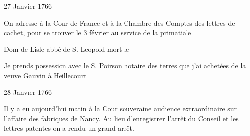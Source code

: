                     \begin{diary}{27 Janvier 1766}{}
                        
                         On adresse à la Cour de France et à la Chambre des
                              Comptes des lettres de cachet, pour se trouver
                           le 3 février au service de
                              la primatiale
                        \bigskip
        
        
                        
                           Dom de Lisle abbé de S. Leopold
                           mort le 
                        \bigskip
        
        
                         Je prends possession avec le S.
                              Poirson
                           notaire des terres
                           que j'ai achetées de la veuve Gauvin à Heillecourt
                        \bigskip
        
        
                     \end{diary}

                     \begin{diary}{28 Janvier 1766}{}
                        
                         Il y a eu aujourd'hui matin à
                              la Cour
                              souveraine audience extraordinaire
                           sur l'affaire des fabriques de
                              Nancy.
                           Au lieu d'enregistrer l'arrêt du Conseil
                           et les lettres patentes on
                           a rendu un
                           grand arrêt. \bigskip
        
        
                     \end{diary}

